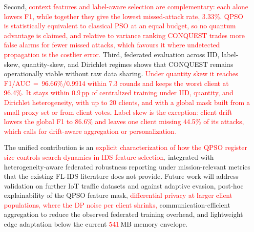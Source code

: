 \documentclass[conference]{IEEEtran}
\begin{document}
Second, \textcolor{red}{context features and label-aware
selection are complementary: each alone lowers F1, while together
they give the lowest missed-attack rate, 3.33\%. QPSO is
statistically equivalent to classical PSO at an equal budget, so
no quantum advantage is claimed, and relative to variance ranking
CONQUEST trades more false alarms for fewer missed attacks, which
favours it where undetected propagation is the costlier error.}
Third, federated evaluation across IID, label-skew,
quantity-skew, and Dirichlet regimes shows that CONQUEST
remains operationally viable without raw data sharing.
\textcolor{red}{Under quantity skew it reaches F1/AUC\,$=$\,96.66\%/0.9914
within 7.3 rounds and keeps the worst client at 96.4\%. It stays
within 0.9\,pp of centralized training under IID, quantity, and
Dirichlet heterogeneity, with up to 20 clients, and with a global
mask built from a small proxy set or from client votes. Label skew is the exception: client drift lowers the global
F1 to 86.6\% and leaves one client missing 44.5\% of its attacks,
which calls for drift-aware aggregation or personalization.}

The unified contribution is an \textcolor{red}{explicit
characterization of how the QPSO register size controls search
dynamics in IDS feature selection}, integrated with heterogeneity-aware
federated robustness reporting under mission-relevant
metrics that the existing FL-IDS literature does not provide.
Future work will address validation on further IoT traffic datasets
and against adaptive evasion, post-hoc
explainability of the QPSO feature mask, \textcolor{red}{differential privacy at
larger client populations, where the DP noise per client shrinks,} communication-efficient aggregation to
reduce the observed federated
training overhead, and lightweight edge adaptation below
the current \textcolor{red}{541}\,MB memory envelope.
\end{document}
